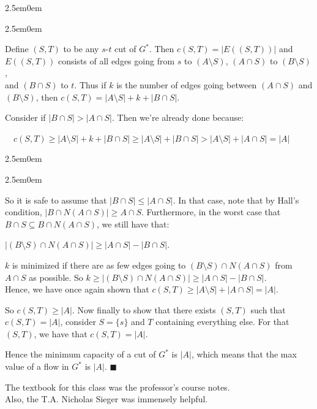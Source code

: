 \documentclass{book}
\newcommand{\hThree}{%
   \color{PineGreen}
   \fontsize{13}{15}\selectfont%
}
\newcommand{\exOne}{%
   \color{Purple}%
   \fontsize{14}{16}\selectfont%
}
\newenvironment{myIndent}{%
   \begin{adjustwidth}{2.5em}{0em}%
}{%
   \end{adjustwidth}%
}
\newcommand{\retTwo}{\hfill\bigbreak}
\begin{document}
{\begin{myIndent}
\begin{myIndent}
      Define $(S, T)$ to be any $s$-$t$ cut of $G^*$. Then $c(S, T) = |E((S, T))|$ and\\ $E((S, T))$ consists of all edges going from $s$ to $(A \setminus S)$, $(A \cap S)$ to $(B \setminus S)$,\\ and $(B \cap S)$ to $t$. Thus if $k$ is the number of edges going between $(A \cap S)$ and $(B \setminus S)$, then $c(S, T) = |A \setminus S| + k + |B \cap S|$.\retTwo

      Consider if $|B \cap S| > |A \cap S|$. Then we're already done because:
      \end{myIndent}
      \end{myIndent}}
         {\centering\hThree$\quad c(S, T) \geq |A \setminus S| + k + |B \cap S| \geq |A \setminus S| + |B \cap S| > |A \setminus S| + |A \cap S| = |A|$\retTwo\par}
      {\begin{myIndent}\hThree
      \begin{myIndent}
      
      So it is safe to assume that $|B \cap S| \leq |A \cap S|$. In that case, note that by Hall's\\ condition, $|B \cap N(A \cap S)| \geq A \cap S$. Furthermore, in the worst case that\\ $B \cap S \subseteq B \cap N(A \cap S)$, we still have that:
      
      {\centering $|(B \setminus S) \cap N(A \cap S)| \geq |A \cap S| - |B \cap S|$.\retTwo\par}

      $k$ is minimized if there are as few edges going to $(B \setminus S) \cap N(A \cap S)$ from\\ $A \cap S$ as possible. So $k \geq |(B \setminus S) \cap N(A \cap S)| \geq |A \cap S| - |B \cap S|$.\\ Hence, we have once again shown that $c(S, T) \geq |A \setminus S| + |A \cap S| = |A|$.\retTwo
      
      So $c(S, T) \geq |A|$. Now finally to show that there exists $(S, T)$ such that\\ $c(S, T) = |A|$, consider $S = \{s\}$ and $T$ containing everything else. For that\\ $(S, T)$, we have that $c(S, T) = |A|$.\retTwo

      Hence the minimum capacity of a cut of $G^*$ is $|A|$, which means that the max value of a flow in $G^*$ is $|A|$. $\blacksquare$
   \end{myIndent}
\end{myIndent}}
\retTwo
\retTwo
\retTwo
\retTwo
\exOne The textbook for this class was the professor's course notes.\\
Also, the T.A. Nicholas Sieger was immensely helpful.
\end{document}
